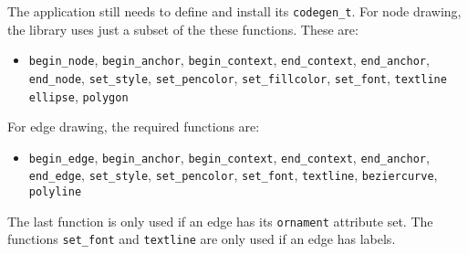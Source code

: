 The application still needs to define and install its {\tt codegen\_t}.
For node drawing, the library uses just a subset of the these functions.
These are:
\begin{itemize}
\item {\tt begin\_node}, {\tt begin\_anchor}, {\tt begin\_context},
{\tt end\_context}, {\tt end\_anchor}, {\tt end\_node}, 
{\tt set\_style}, {\tt set\_pencolor}, {\tt set\_fillcolor}, {\tt set\_font}, 
{\tt textline} {\tt ellipse}, {\tt polygon}
\end{itemize}
For edge drawing, the required functions are:
\begin{itemize}
\item {\tt begin\_edge}, {\tt begin\_anchor}, {\tt begin\_context},
{\tt end\_context}, {\tt end\_anchor}, {\tt end\_edge}, 
{\tt set\_style}, {\tt set\_pencolor}, {\tt set\_font},
{\tt textline}, {\tt beziercurve}, {\tt polyline}
\end{itemize}
The last function is only used if an edge has its {\tt ornament}
attribute set. The functions {\tt set\_font} and {\tt textline} are
only used if an edge has labels.

